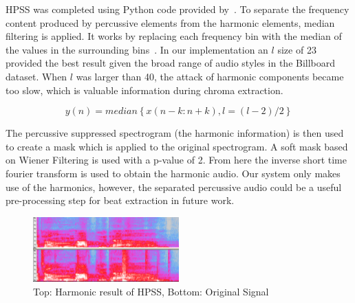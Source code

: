 \documentclass{article}
\begin{document}
HPSS was completed using Python code provided by~\cite{librosa:24}. To separate
the frequency content produced by percussive elements from the harmonic
elements, median filtering is applied.  It works by replacing each frequency
bin with the median of the values in the surrounding bins~\cite{FitzGerald:11}.
In our implementation an $l$ size of 23 provided the best result given the
broad range of audio styles in the Billboard dataset. When $l$ was larger than
40, the attack of harmonic components became too slow, which is valuable
information during chroma extraction.

$$ y(n) = median \left \{x(n-k:n+k),l = (l-2)/2  \right \} $$

The percussive suppressed spectrogram (the harmonic information) is then used
to create a mask which is applied to the original spectrogram. A soft mask
based on Wiener Filtering is used with a p-value of 2. From here the inverse
short time fourier transform is used to obtain the harmonic audio. Our system
only makes use of the harmonics, however, the  separated percussive audio could
be a useful pre-processing step for beat extraction in future work.

\begin{figure}
   \centering
    \includegraphics[width=0.5\textwidth]{hpssspec.png}
   \caption{Top: Harmonic result of HPSS, Bottom: Original Signal}\label{fig:HPSS}
\end{figure}
\end{document}
